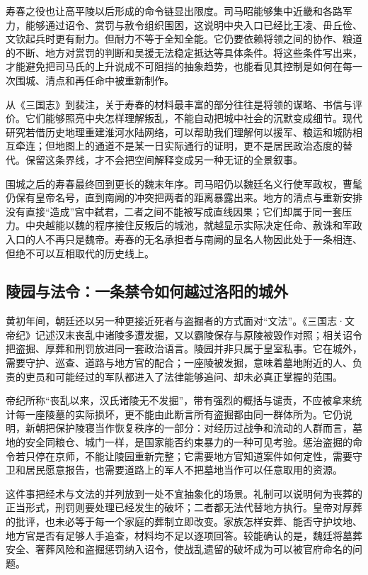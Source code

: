 寿春之役也让高平陵以后形成的命令链显出限度。司马昭能够集中近畿和各路军力，能够通过诏令、赏罚与赦令组织围困，这说明中央入口已经比王凌、毌丘俭、文钦起兵时更有耐力。但耐力不等于全知全能。它仍要依赖将领之间的协作、粮道的不断、地方对赏罚的判断和吴援无法稳定抵达等具体条件。将这些条件写出来，才能避免把司马氏的上升说成不可阻挡的抽象趋势，也能看见其控制是如何在每一次围城、清点和再任命中被重新制作。

从《三国志》到裴注，关于寿春的材料最丰富的部分往往是将领的谋略、书信与评价。它们能够照亮中央怎样理解叛乱，不能自动把城中社会的沉默变成细节。现代研究若借历史地理重建淮河水陆网络，可以帮助我们理解何以援军、粮运和城防相互牵连；但地图上的通道不是某一日实际通行的证明，更不是居民政治态度的替代。保留这条界线，才不会把空间解释变成另一种无证的全景叙事。

围城之后的寿春最终回到更长的魏末年序。司马昭仍以魏廷名义行使军政权，曹髦仍保有皇帝名号，直到南阙的冲突把两者的距离暴露出来。地方的清点与重新安排没有直接“造成”宫中弑君，二者之间不能被写成直线因果；它们却属于同一套压力。中央越能以魏的程序接住反叛后的城池，就越显示实际决定任命、赦诛和军政入口的人不再只是魏帝。寿春的无名承担者与南阙的显名人物因此处于一条相连、但绝不可以互相取代的历史线上。
\subsection{陵园与法令：一条禁令如何越过洛阳的城外}

黄初年间，朝廷还以另一种更接近死者与盗掘者的方式面对“文法”。《三国志·文帝纪》记述汉末丧乱中诸陵多遭发掘，又以霸陵保存与原陵被毁作对照；相关诏令把盗掘、厚葬和刑罚放进同一套政治语言。陵园并非只属于皇室私事。它在城外，需要守护、巡查、道路与地方官的配合；一座陵被发掘，意味着墓地附近的人、负责的吏员和可能经过的军队都进入了法律能够追问、却未必真正掌握的范围。

帝纪所称“丧乱以来，汉氏诸陵无不发掘”，带有强烈的概括与谴责，不应被拿来统计每一座陵墓的实际损坏，更不能由此断言所有盗掘都由同一群体所为。它仍说明，新朝把保护陵寝当作恢复秩序的一部分：对经历过战争和流动的人群而言，墓地的安全同粮仓、城门一样，是国家能否约束暴力的一种可见考验。惩治盗掘的命令若只停在京师，不能让陵园重新完整；它需要地方官知道案件如何定性，需要守卫和居民愿意报告，也需要道路上的军人不把墓地当作可以任意取用的资源。

这件事把经术与文法的并列放到一处不宜抽象化的场景。礼制可以说明何为丧葬的正当形式，刑罚则要处理已经发生的破坏；二者都无法代替地方执行。皇帝对厚葬的批评，也未必等于每一个家庭的葬制立即改变。家族怎样安葬、能否守护坟地、地方官是否有足够人手追查，材料均不足以逐项回答。较能确认的是，魏廷将墓葬安全、奢葬风险和盗掘惩罚纳入诏令，使战乱遗留的破坏成为可以被官府命名的问题。

